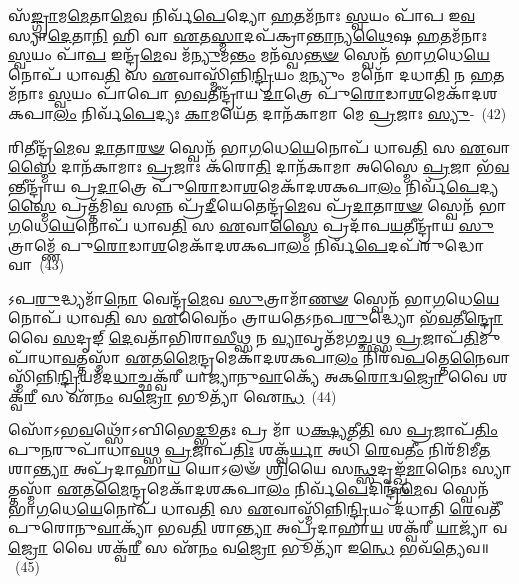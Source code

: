 𑌸᳴\-\ul{𑌙𑍍𑌗𑍍𑌰𑌾}\-𑌮\-\ul{𑌮𑍇}\-𑌤𑌾\-\ul{𑌮𑍇}\-𑌵 𑌨𑌿𑌰𑍍𑌵᳴\-\ul{𑌪𑍇}\-𑌦𑍍𑌯𑍋 \ul{𑌹}\-𑌤𑌮᳴𑌨𑌾𑌃 \ul{𑌸𑍍𑌵}\-𑌯𑌂 𑌪𑌾᳴𑌪 𑌇\-\ul{𑌵} 𑌸𑍍𑌯𑌾\-\ul{𑌦𑍇}\-𑌤𑌾\-\ul{𑌨𑌿} 𑌹𑌿 𑌵𑌾 \ul{𑌏}\-𑌤\-\ul{𑌸𑍍𑌮𑌾}\-𑌦𑌪᳴𑌕𑍍𑌰𑌾\-\ul{𑌨𑍍𑌤𑌾}\-𑌨𑍍𑌯\-\ul{𑌥𑍈}\-𑌷 \ul{𑌹}\-𑌤𑌮᳴𑌨𑌾𑌃 \ul{𑌸𑍍𑌵}\-𑌯𑌂 𑌪𑌾᳴\-\ul{𑌪} 𑌇𑌨𑍍𑌦𑍍𑌰᳴\-\ul{𑌮𑍇}\-𑌵 𑌮᳴\-\ul{𑌨𑍍𑌯𑍁}\-𑌮\-\ul{𑌨𑍍𑌤𑌂} 𑌮𑌨᳴𑌸𑍍𑌵\-\ul{𑌨𑍍𑌤}\-\-\ul{𑍟} 𑌸𑍍𑌵𑍇𑌨᳴ 𑌭𑌾\-\ul{𑌗}\-𑌧𑍇\-\ul{𑌯𑍇}\-𑌨𑍋𑌪᳴ 𑌧𑌾𑌵\-\ul{𑌤𑌿} 𑌸 \ul{𑌏}\-𑌵𑌾𑌸𑍍𑌮𑌿᳴𑌨𑍍𑌨𑌿\-\ul{𑌨𑍍𑌦𑍍𑌰𑌿}\-𑌯𑌂 \ul{𑌮}\-𑌨𑍍𑌯𑍁𑌂 𑌮𑌨𑍋᳴ 𑌦𑌧𑌾\-\ul{𑌤𑌿} 𑌨 \ul{𑌹}\-𑌤𑌮᳴𑌨𑌾𑌃 \ul{𑌸𑍍𑌵}\-𑌯𑌂 𑌪𑌾᳴𑌪𑍋 𑌭\-\ul{𑌵}\-𑌤𑍀𑌨𑍍𑌦𑍍𑌰𑌾᳴𑌯 \ul{𑌦𑌾}\-𑌤𑍍𑌰𑍇 𑌪𑍁᳴\-\ul{𑌰𑍋}\-𑌡𑌾\-\ul{𑌶}\-𑌮𑍇𑌕𑌾᳴\-𑌦𑌶\-𑌕𑌪𑌾\-\ul{𑌲𑌂} 𑌨𑌿𑌰𑍍𑌵᳴\-\ul{𑌪𑍇}\-𑌦𑍍𑌯𑌃 \ul{𑌕𑌾}\-𑌮𑌯𑍇᳴\-\ul{𑌤} 𑌦𑌾𑌨᳴𑌕𑌾𑌮𑌾 𑌮𑍇 \ul{𑌪𑍍𑌰}\-𑌜𑌾𑌃 \ul{𑌸𑍍𑌯𑍁}\--~(42)

𑌰𑌿𑌤𑍀𑌨𑍍𑌦𑍍𑌰᳴\-\ul{𑌮𑍇}\-𑌵 \ul{𑌦𑌾}\-𑌤𑌾\-\ul{𑌰}\-\-\ul{𑍟} 𑌸𑍍𑌵𑍇𑌨᳴ 𑌭𑌾\-\ul{𑌗}\-𑌧𑍇\-\ul{𑌯𑍇}\-𑌨𑍋𑌪᳴ 𑌧𑌾𑌵\-\ul{𑌤𑌿} 𑌸 \ul{𑌏}\-𑌵𑌾\-\ul{𑌸𑍍𑌮𑍈} 𑌦𑌾𑌨᳴𑌕𑌾𑌮𑌾𑌃 \ul{𑌪𑍍𑌰}\-𑌜𑌾𑌃 𑌕᳴𑌰𑍋\-\ul{𑌤𑌿} 𑌦𑌾𑌨᳴𑌕𑌾𑌮𑌾 𑌅𑌸𑍍𑌮𑍈 \ul{𑌪𑍍𑌰}\-𑌜𑌾 𑌭᳴\-\ul{𑌵}\-𑌨𑍍𑌤𑍀𑌨𑍍𑌦𑍍𑌰𑌾᳴𑌯 𑌪𑍍𑌰\-\ul{𑌦𑌾}\-𑌤𑍍𑌰𑍇 𑌪𑍁᳴\-\ul{𑌰𑍋}\-𑌡𑌾\-\ul{𑌶}\-𑌮𑍇𑌕𑌾᳴\-𑌦𑌶\-𑌕𑌪𑌾\-\ul{𑌲𑌂} 𑌨𑌿𑌰𑍍𑌵᳴\-\ul{𑌪𑍇}\-𑌦𑍍𑌯\-\ul{𑌸𑍍𑌮𑍈} 𑌪𑍍𑌰𑌤𑍍𑌤᳴𑌮𑌿\-\ul{𑌵} 𑌸𑌨𑍍𑌨 𑌪𑍍𑌰᳴\-\ul{𑌦𑍀}\-𑌯𑍇𑌤𑍇𑌨𑍍𑌦𑍍𑌰᳴\-\ul{𑌮𑍇}\-𑌵 𑌪𑍍𑌰᳴\-\ul{𑌦𑌾}\-𑌤𑌾\-\ul{𑌰}\-\-\ul{𑍟} 𑌸𑍍𑌵𑍇𑌨᳴ 𑌭𑌾\-\ul{𑌗}\-𑌧𑍇\-\ul{𑌯𑍇}\-𑌨𑍋𑌪᳴ 𑌧𑌾𑌵\-\ul{𑌤𑌿} 𑌸 \ul{𑌏}\-𑌵𑌾\-\ul{𑌸𑍍𑌮𑍈} 𑌪𑍍𑌰𑌦𑌾᳴𑌪\-\ul{𑌯}\-𑌤𑍀𑌨𑍍𑌦𑍍𑌰𑌾᳴𑌯 \ul{𑌸𑍁}\-𑌤𑍍𑌰𑌾𑌮𑍍𑌣𑍇᳴ 𑌪𑍁\-\ul{𑌰𑍋}\-𑌡𑌾\-\ul{𑌶}\-𑌮𑍇𑌕𑌾᳴\-𑌦𑌶\-𑌕𑌪𑌾\-\ul{𑌲𑌂} 𑌨𑌿𑌰𑍍𑌵᳴\-\ul{𑌪𑍇}\-𑌦𑌪᳴𑌰𑍁𑌦𑍍𑌧𑍋 𑌵𑌾\-~(43)

𑌽𑌪\-\ul{𑌰𑍁}\-𑌦𑍍𑌧𑍍𑌯𑌮𑌾᳴\-\ul{𑌨𑍋} 𑌵𑍇𑌨𑍍𑌦𑍍𑌰᳴\-\ul{𑌮𑍇}\-𑌵 \ul{𑌸𑍁}\-𑌤𑍍𑌰𑌾𑌮𑌾᳴\-\ul{𑌣}\-\-\ul{𑍟} 𑌸𑍍𑌵𑍇𑌨᳴ 𑌭𑌾\-\ul{𑌗}\-𑌧𑍇\-\ul{𑌯𑍇}\-𑌨𑍋𑌪᳴ 𑌧𑌾𑌵\-\ul{𑌤𑌿} 𑌸 \ul{𑌏}\-𑌵𑍈𑌨𑌂᳴ 𑌤𑍍𑌰𑌾𑌯𑌤𑍇\-𑌽𑌨𑌪\-\ul{𑌰𑍁}\-𑌦𑍍𑌧𑍍𑌯𑍋 𑌭᳴\-\ul{𑌵}\-𑌤𑍀\-\ul{𑌨𑍍𑌦𑍍𑌰𑍋} 𑌵𑍈 \ul{𑌸}\-𑌦𑍃𑌙𑍍 \ul{𑌦𑍇}\-𑌵𑌤𑌾᳴𑌭𑌿𑌰𑌾\-\ul{𑌸𑍀}\-𑌥𑍍𑌸 𑌨 \ul{𑌵𑍍𑌯𑌾}\-𑌵𑍃𑌤᳴𑌮𑌗\-\ul{𑌚𑍍𑌛}\-𑌥𑍍𑌸 \ul{𑌪𑍍𑌰}\-𑌜𑌾𑌪᳴\-\ul{𑌤𑌿}\-𑌮𑍁𑌪𑌾᳴\-𑌧𑌾\-\ul{𑌵}\-𑌤𑍍𑌤𑌸𑍍𑌮𑌾᳴ \ul{𑌏}\-𑌤\-\ul{𑌮𑍈}\-𑌨𑍍𑌦𑍍𑌰𑌮𑍇𑌕𑌾᳴\-𑌦𑌶\-𑌕𑌪𑌾\-\ul{𑌲𑌂} 𑌨𑌿𑌰᳴𑌵\-\ul{𑌪}\-𑌤𑍍𑌤𑍇\-\ul{𑌨𑍈}\-𑌵𑌾𑌸𑍍𑌮𑌿᳴𑌨𑍍𑌨𑌿\-\ul{𑌨𑍍𑌦𑍍𑌰𑌿}\-𑌯\-𑌮᳴𑌦\-\ul{𑌧𑌾}\-𑌚𑍍𑌛𑌕𑍍𑌵᳴𑌰𑍀 𑌯𑌾𑌜𑍍𑌯𑌾𑌨𑍁\-\ul{𑌵𑌾}\-𑌕𑍍𑌯𑍇᳴ 𑌅𑌕\-\ul{𑌰𑍋}\-𑌦𑍍𑌵\-\ul{𑌜𑍍𑌰𑍋} 𑌵𑍈 𑌶𑌕𑍍𑌵᳴\-\ul{𑌰𑍀} 𑌸 𑌏᳴\-\ul{𑌨𑌂} 𑌵\-\ul{𑌜𑍍𑌰𑍋} 𑌭𑍂𑌤𑍍𑌯𑌾᳴ 𑌐\-\ul{𑌨𑍍𑌧}\-~(44)

𑌸𑍋᳴\-𑌽𑌭\-\ul{𑌵}\-𑌥𑍍𑌸𑍋᳴\-𑌽𑌬𑌿𑌭𑍇\-\ul{𑌦𑍍𑌭𑍂}\-𑌤𑌃 𑌪𑍍𑌰 𑌮𑌾᳴ 𑌧\-\ul{𑌕𑍍𑌷𑍍𑌯}\-𑌤𑍀\-\ul{𑌤𑌿} 𑌸 \ul{𑌪𑍍𑌰}\-𑌜𑌾𑌪᳴\-\ul{𑌤𑌿𑌂} 𑌪𑍁\-\ul{𑌨}\-𑌰𑍁𑌪𑌾᳴𑌧𑌾\-\ul{𑌵}\-𑌥𑍍𑌸 \ul{𑌪𑍍𑌰}\-𑌜𑌾𑌪᳴\-\ul{𑌤𑌿𑌃} 𑌶𑌕𑍍𑌵᳴\-\ul{𑌰𑍍𑌯𑌾} 𑌅𑌧𑌿᳴ \ul{𑌰𑍇}\-𑌵\-\ul{𑌤𑍀𑌂} 𑌨𑌿𑌰᳴𑌮𑌿𑌮𑍀\-\ul{𑌤} 𑌶𑌾\-\ul{𑌨𑍍𑌤𑍍𑌯𑌾} 𑌅𑌪𑍍𑌰᳴𑌦𑌾𑌹𑌾\-\ul{𑌯} 𑌯𑍋\-𑌽𑌲𑍟᳴ \ul{𑌶𑍍𑌰𑌿}\-𑌯𑍈 𑌸\-\ul{𑌨𑍍𑌥𑍍𑌸}\-𑌦𑍃𑌙𑍍𑌖𑍍𑌸᳴\-\ul{𑌮𑌾}\-𑌨𑍈𑌃 𑌸𑍍𑌯𑌾𑌤𑍍𑌤𑌸𑍍𑌮𑌾᳴ \ul{𑌏}\-𑌤\-\ul{𑌮𑍈}\-𑌨𑍍𑌦𑍍𑌰𑌮𑍇𑌕𑌾᳴\-𑌦𑌶\-𑌕𑌪𑌾\-\ul{𑌲𑌂} 𑌨𑌿𑌰𑍍𑌵᳴\-\ul{𑌪𑍇}\-𑌦𑌿𑌨𑍍𑌦𑍍𑌰᳴\-\ul{𑌮𑍇}\-𑌵 𑌸𑍍𑌵𑍇𑌨᳴ 𑌭𑌾\-\ul{𑌗}\-𑌧𑍇\-\ul{𑌯𑍇}\-𑌨𑍋𑌪᳴ 𑌧𑌾𑌵\-\ul{𑌤𑌿} 𑌸 \ul{𑌏}\-𑌵𑌾𑌸𑍍𑌮𑌿᳴𑌨𑍍𑌨𑌿\-\ul{𑌨𑍍𑌦𑍍𑌰𑌿}\-𑌯𑌂 𑌦᳴𑌧𑌾𑌤𑌿 \ul{𑌰𑍇}\-𑌵𑌤𑍀᳴ 𑌪𑍁𑌰𑍋𑌨𑍁\-\ul{𑌵𑌾}\-𑌕𑍍𑌯𑌾᳴ 𑌭𑌵\-\ul{𑌤𑌿} 𑌶𑌾\-\ul{𑌨𑍍𑌤𑍍𑌯𑌾} 𑌅𑌪𑍍𑌰᳴𑌦𑌾𑌹𑌾\-\ul{𑌯} 𑌶𑌕𑍍𑌵᳴𑌰𑍀 \ul{𑌯𑌾}\-𑌜𑍍𑌯𑌾᳴ 𑌵\-\ul{𑌜𑍍𑌰𑍋} 𑌵𑍈 𑌶𑌕𑍍𑌵᳴\-\ul{𑌰𑍀} 𑌸 𑌏᳴\-\ul{𑌨𑌂} 𑌵\-\ul{𑌜𑍍𑌰𑍋} 𑌭𑍂𑌤𑍍𑌯𑌾᳴ 𑌇\-\ul{𑌨𑍍𑌧𑍇} 𑌭𑌵᳴\-\ul{𑌤𑍍𑌯𑍇}\-𑌵॥~(45)

